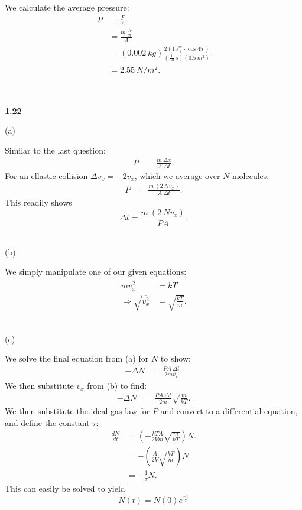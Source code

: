 \documentclass{article}
\begin{document}
We calculate the average pressure:
\begin{align*}
P & =\frac{F}{A}\\
 & =\frac{m\ \frac{dv}{dt}}{A}\\
 & =( 0.002\ kg)\frac{2\left( 15\frac{m}{s} \cdot \cos 45\ \right)}{\left(\frac{1}{30} \ s\right)\left( 0.5\ m^{2}\right)}\\
 & =\boxed{2.55\ N/m^{2}} .
\end{align*}


\

\hline

\textbf{\underline{1.22}}

(a)

Similar to the last question:
\begin{align*}
P & =\frac{m\ \Delta x}{A\ \Delta t} .
\end{align*}
For an ellastic collision $\Delta v_{x} =-2v_{x}$, which we average over $N$ molecules:
\begin{align*}
P & =\frac{m\ \left( 2\ N\overline{v_{x}}\right)}{A\ \Delta t} .
\end{align*}
This readily shows
\begin{equation*}
\boxed{\Delta t=\frac{m\ \left( 2\ N\overline{v_{x}}\right)}{PA} .}
\end{equation*}
\

(b)

We simply manipulate one of our given equations:
\begin{align*}
m\overline{v_{x}^{2}} & =kT\\
\Rightarrow \sqrt{\overline{v_{x}^{2}}} & =\sqrt{\frac{kT}{m}} .
\end{align*}
\

(c)

We solve the final equation from (a) for $N$ to show:
\begin{align*}
-\Delta N & =\frac{PA\ \Delta t}{2m\overline{v_{x}}} .
\end{align*}
We then substitute $\overline{v_{x}}$ from (b) to find:
\begin{equation*}
\begin{aligned}
-\Delta N & =\frac{PA\ \Delta t}{2m}\sqrt{\frac{m}{kT}} .
\end{aligned}
\end{equation*}
We then substitute the ideal gas law for $P$ and convert to a differential equation, and define the constant $\tau $:
\begin{equation*}
\begin{aligned}
\frac{dN}{dt} & =\left( -\frac{kTA}{2Vm}\sqrt{\frac{m}{kT}}\right) N.\\
 & =-\left(\frac{A}{2V}\sqrt{\frac{kT}{m}}\right) N\\
 & =-\frac{1}{\tau } N.
\end{aligned}
\end{equation*}
This can easily be solved to yield
\begin{equation*}
N( t) =N( 0) e^{\frac{-t}{\tau }}
\end{equation*}
\end{document}
